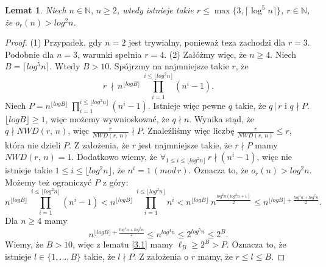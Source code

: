 \documentclass[declaration,shortabstract]{iithesis}
\theoremstyle{definition}
\theoremstyle{remark} \newtheorem{observation}{Obserwacja}
\theoremstyle{plain} \newtheorem{theorem}{Twierdzenie}
\theoremstyle{plain} \newtheorem{lemma}{Lemat}
\theoremstyle{remark} \newtheorem*{remark*}{Uwaga}
\theoremstyle{reminder} \newtheorem*{reminder*}{Przypomnienie}
\begin{document}
\begin{lemma}\label{r_szacowanie}
	Niech $n \in \mathbb{N}, \, n \geq 2$, wtedy istnieje takie $r \leq \max \{3, \lceil\log^5n\rceil \}$, $r \in \mathbb{N}$, że $o_r(n) > log^2n$.
\end{lemma}
	
\begin{proof}
	(1) Przypadek, gdy $n=2$ jest trywialny, ponieważ teza zachodzi dla $r=3$. Podobnie dla $n=3$, warunki spełnia $r=4$.\newline
	(2) Załóżmy więc, że $n \geq 4$. Niech $B = \lceil log^5n \rceil$. Wtedy $B > 10$. \newline
	Spójrzmy na najmniejsze takie $r$, że \[ r \, \nmid \, n^{\lfloor log B \rfloor} \: \prod_{i=1}^{i \leq \lfloor log^2 n \rfloor}(n^i - 1).\]
	Niech $P = n^{\lfloor log B \rfloor} \: \prod_{i=1}^{i \leq \lfloor log^2 n \rfloor}(n^i - 1)$. 
	Istnieje więc pewne $q$ takie, że $q \, | \, r$ i $q \nmid P$. $\lfloor log B \rfloor \geq 1$, więc możemy wywnioskować, że $q \nmid n$. Wynika stąd, że $q \nmid NWD(r,\, n)$, więc $\frac{r}{NWD(r, \, n)} \nmid P$. Znaleźliśmy więc liczbę $\frac{r}{NWD(r, \, n)} \leq r$, która nie dzieli $P$. Z założenia, że $r$ jest najmniejsze takie, że $r \nmid P$ mamy $NWD(r, \, n) = 1$.\newline
	Dodatkowo wiemy, że $\forall_{1 \leq i \leq \lfloor log^2 n \rfloor} \, r \nmid (n^i - 1)$, więc nie istnieje takie $1 \leq i \leq \lfloor log^2 n \rfloor$, że $n^i = 1 \, (mod \, r)$. Oznacza to, że $o_r(n) > log^2n$.
	Możemy też ograniczyć $P$ z góry:
	\[n^{\lfloor log B \rfloor} \: \prod_{i=1}^{i \leq \lfloor log^2 n \rfloor}(n^i - 1) < n^{\lfloor log B \rfloor} \: \prod_{i=1}^{i \leq \lfloor log^2 n \rfloor}n^i <  n^{\lfloor log B \rfloor} \: n^{\frac{log^2n(log^2n + 1)}{2}} \leq n^{{\lfloor log B \rfloor} + \frac{log^4n + log^2n}{2}}.\]
	Dla $n \geq 4$ mamy\[n^{{\lfloor log B \rfloor} + \frac{log^4n + log^2n}{2}} \leq n^{log^4n} \leq 2^{log^5n} \leq 2^B.\]
	Wiemy, że $B > 10$, więc z lematu \ref{3.1} mamy $\ell_B \geq 2^B > P$. Oznacza to, że istnieje $l \in \{1, \dots, B\}$ takie, że $l \nmid P$. Z założenia o $r$ mamy, że $r \leq l \leq B$.
\end{proof}
	

	
	

	
\end{document}
